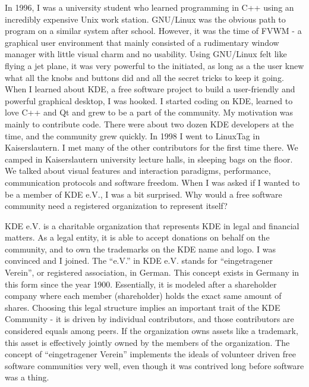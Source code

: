 

\noindent{}In 1996, I was a university student who learned programming
in C++ using an incredibly expensive Unix work station. GNU/Linux was the
obvious path to program on a similar system after school. However, it
was the time of FVWM - a graphical user environment that mainly
consisted of a rudimentary window manager with little visual charm
and no usability. Using GNU/Linux felt like flying a jet plane, it was
very powerful to the 
initiated, as long as a the user knew what all the knobs and buttons
did and all the secret tricks to keep it going. When I learned about
KDE, a free software project to build a 
user-friendly and powerful graphical desktop, I was hooked. I
started coding on KDE, learned to love C++ and Qt and grew to be a
part of the community. My motivation was mainly to contribute
code. There were about two dozen KDE developers at the 
time, and the community grew quickly. In 1998 I went to LinuxTag in
Kaiserslautern. I met many of the other contributors for the first
time there. We camped in Kaiserslautern university lecture halls, in sleeping bags
on the floor. We talked about
visual features and interaction paradigms, performance, communication
protocols and software freedom. When I was asked if I wanted to be a
member of KDE e.V., I was a bit surprised. Why would a free software
community need a registered organization to represent itself?

KDE e.V. is a charitable organization that represents KDE
in legal and financial matters. As a legal entity, it is able to 
accept donations on behalf on the community, and to own the trademarks
on the KDE name and logo. I was convinced and I joined. The ``e.V.''
in KDE e.V. stands for ``eingetragener Verein'', or registered
association, in German. This concept exists in Germany in this form
since the year 1900. Essentially, it is modeled after a shareholder
company where each member (shareholder) holds the exact same amount of
shares. Choosing this legal structure implies an important trait of the
KDE Community - it is driven by individual contributors, and those
contributors are considered equals among peers. If the organization
owns assets like a trademark, this asset is effectively jointly owned
by the members of the organization. The concept of ``eingetragener
Verein'' implements the ideals of volunteer driven free software
communities very well, even though it was contrived long before
software was a thing.

